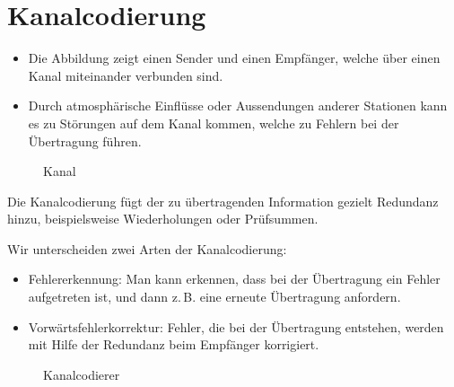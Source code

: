 
\section{Kanalcodierung}
\label{section:kanalcodierung}
\begin{frame}%
\begin{itemize}
  \item Die Abbildung zeigt einen Sender und einen Empfänger, welche über einen Kanal miteinander verbunden sind.
  \item Durch atmosphärische Einflüsse oder Aussendungen anderer Stationen kann es zu Störungen auf dem Kanal kommen, welche zu Fehlern bei der Übertragung führen.
  \end{itemize}

\begin{figure}
    \caption{\scriptsize Kanal}
    \label{kanal}
\end{figure}

\end{frame}

\begin{frame}Die Kanalcodierung fügt der zu übertragenden Information gezielt Redundanz hinzu, beispielsweise Wiederholungen oder Prüfsummen.

\end{frame}

\begin{frame}Wir unterscheiden zwei Arten der Kanalcodierung:

\begin{itemize}
  \item Fehlererkennung: Man kann erkennen, dass bei der Übertragung ein Fehler aufgetreten ist, und dann z. B. eine erneute Übertragung anfordern.
  \item Vorwärtsfehlerkorrektur: Fehler, die bei der Übertragung entstehen, werden mit Hilfe der Redundanz beim Empfänger korrigiert.
  \end{itemize}

\begin{figure}
    \caption{\scriptsize Kanalcodierer}
    \label{kanalcodierer}
\end{figure}

\end{frame}

